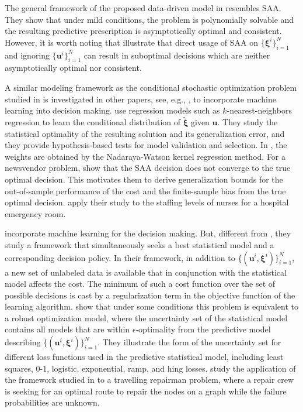 \documentclass[final,onefignum,onetabnum]{class}
\newcommand{\bs}[1]{\boldsymbol{#1}} %
\newcommand{\txi}{\tilde{\bs{\xi}}}
\begin{document}
The general framework of the proposed data-driven model in \citet{bertsimas2018predictive} resembles SAA. They  show that under mild conditions, the problem is polynomially solvable and the resulting predictive prescription  is asymptotically optimal   and consistent. However, it is worth noting that \citet{bertsimas2018predictive} illustrate that direct usage of SAA on $\{\bs{\xi}^{i}\}_{i=1}^{N}$ and ignoring $\{\bs{u}^{i}\}_{i=1}^{N}$ can result in suboptimal decisions which are  neither asymptotically optimal nor consistent. 

A similar modeling framework as the conditional stochastic optimization problem studied in \citet{bertsimas2018predictive} is investigated  in other papers, see, e.g., \citet{hannah2010,deng2018LEO,ban2019,ho2019}, to incorporate machine learning into decision making. \citet{deng2018LEO} use regression models such as $k$-nearest-neighbors regression to learn the conditional distribution  of $\txi$ given $\bs{u}$. They  study the statistical optimality of the resulting solution and its generalization error, and they provide hypothesis-based tests for model validation and selection.  
In \citet{hannah2010,ban2019,ho2019}, the weights are obtained by the  Nadaraya-Watson  kernel  regression method. 
For a newsvendor problem, \citet{ban2019} show that the  SAA decision does not converge to the true optimal decision. This motivates them to derive generalization bounds for the out-of-sample performance of the cost and the finite-sample bias from the true optimal decision. \citet{ban2019} apply their study to the staffing levels of nurses for a hospital emergency room. 

\citet{tulabandhula2013ML} incorporate machine learning for the decision making. But, different from \citet{bertsimas2018predictive},  they study a framework that simultaneously seeks a best statistical model and a corresponding decision policy. In their framework, in addition to $\{(\bs{u}^{i},\bs{\xi}^{i})\}_{i=1}^{N}$, a new set of unlabeled data is available that in conjunction with the statistical model  affects the cost. The minimum of such a cost function over the set of possible decisions is cast by a regularization term in the objective function  of the learning algorithm. \citet{tulabandhula2013ML} show that under some conditions this problem is equivalent to a robust optimization model, where the uncertainty set of the statistical model contains all models that are within $\epsilon$-optimality from the predictive model describing $\{(\bs{u}^{i},\bs{\xi}^{i})\}_{i=1}^{N}$. They illustrate the form of the uncertainty set for different loss functions used in the predictive statistical model, including least squares, 0-1, logistic, exponential, ramp, and hing losses. \citet{tulabandhula2014combining} study the application of the framework studied in \citet{tulabandhula2013ML} to a travelling repairman problem, where a repair crew  is seeking for an optimal route to repair the nodes on a graph while the failure probabilities are unknown. 
\end{document}
